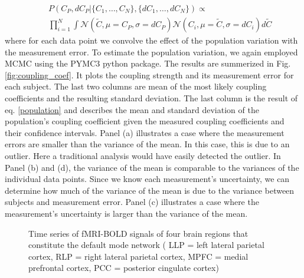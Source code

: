 \documentclass[%
 reprint,
 amsmath,amssymb,
 aps,
]{revtex4-1}
\begin{document}
\begin{eqnarray}
	\label{population}
	&&P(C_{P},dC_{P}|\{C_{1},\dots,C_{N}\},\{dC_{1},\dots,dC_{N}\}) \propto \\
	&&\prod_{i=1}^{N} \int \mathcal{N}(\tilde{C},\mu = C_{P},\sigma = dC_{P})\mathcal{N}(C_{i},\mu = \tilde{C},\sigma = dC_{i})d\tilde{C}\nonumber
\end{eqnarray}
where for each data point we convolve the effect of the population variation with the measurement error.  To estimate the population variation, we again employed MCMC using the PYMC3 python package.  The results are summerized in Fig. \ref{fig:coupling_coef}. It plots the coupling strength and its measurement error for each subject.  The last two columns are mean of the most likely coupling coefficients and the resulting standard deviation.  The last column is the result of eq. \ref{population} and describes the mean and standard deviation of the population's coupling coefficient given the measured coupling coefficients and their confidence intervals.   Panel (a) illustrates a case where the measurement errors are smaller than the variance of the mean.  In this case, this is due to an outlier.  Here a traditional analysis would have easily detected the outlier.  In Panel (b) and (d), the variance of the mean is comparable to the variances of the individual data points.  Since we know each measurement's uncertainty, we can determine how much of the variance of the mean is due to the variance between subjects and measurement error.  Panel (c) illustrates a case where the measurement's uncertainty is larger than the variance of the mean.

\begin{figure}[H]
\begin{center}
\caption{Time series of fMRI-BOLD signals of four brain regions that constitute the default mode network ( LLP = left lateral parietal cortex, RLP = right lateral parietal cortex, MPFC = medial prefrontal cortex, PCC = posterior cingulate cortex) }\label{fig:subject4}
\end{center}
\end{figure}
\end{document}
